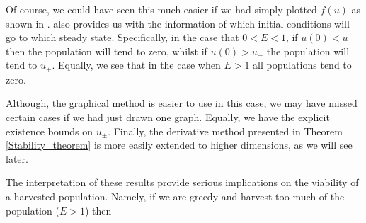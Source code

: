 \begin{example}[frametitle=Linearising around multiple steady states]
{Of course, we could have seen this much easier if we had simply plotted $f(u)$ as shown in .  also provides us with the information of which initial conditions will go to which steady state. Specifically, in the case that $0<E<1$, if $u(0)<u_-$ then the population will tend to zero, whilst if $u(0)>u_-$ the population will tend to $u_+$. Equally, we see that in the case when $E>1$ all populations tend to zero.

Although, the graphical method is easier to use in this case, we may have missed certain cases if we had just drawn one graph. Equally, we have the explicit existence bounds on $u_\pm$. Finally, the derivative method presented in Theorem \ref{Stability_theorem} is more easily extended to higher dimensions, as we will see later.

The interpretation of these results provide serious implications on the viability of a harvested population. Namely, if we are greedy and harvest too much of the population ($E>1$) then }
\end{example}
